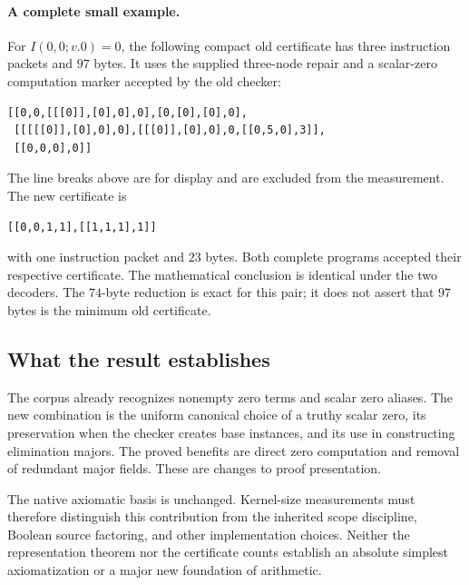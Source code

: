 \paragraph{A complete small example.}
For \(I(0,0;v.0)=0\), the following compact old certificate has three
instruction packets and \(97\) bytes.  It uses the supplied
three-node repair and a scalar-zero computation marker accepted by
the old checker:
\begin{verbatim}
[[0,0,[[[0]],[0],0],0],[0,[0],[0],0],
 [[[[[0]],[0],0],0],[[[0]],[0],0],0,[[0,5,0],3]],
 [[0,0,0],0]]
\end{verbatim}
The line breaks above are for display and are excluded from the
measurement.  The new certificate is
\begin{verbatim}
[[0,0,1,1],[[1,1,1],1]]
\end{verbatim}
with one instruction packet and \(23\) bytes.  Both complete programs
accepted their respective certificate.  The mathematical conclusion
is identical under the two decoders.  The \(74\)-byte reduction is
exact for this pair; it does not assert that \(97\) bytes is the
minimum old certificate.

\subsection{What the result establishes}

The corpus already recognizes nonempty zero terms and scalar zero
aliases.  The new combination is the uniform canonical choice of a
truthy scalar zero, its preservation when the checker creates base
instances, and its use in constructing elimination majors.  The
proved benefits are direct zero computation and removal of redundant
major fields.  These are changes to proof presentation.

The native axiomatic basis is unchanged.  Kernel-size measurements
must therefore distinguish this contribution from the inherited
scope discipline, Boolean source factoring, and other implementation
choices.  Neither the representation theorem nor the certificate
counts establish an absolute simplest axiomatization or a major new
foundation of arithmetic.

